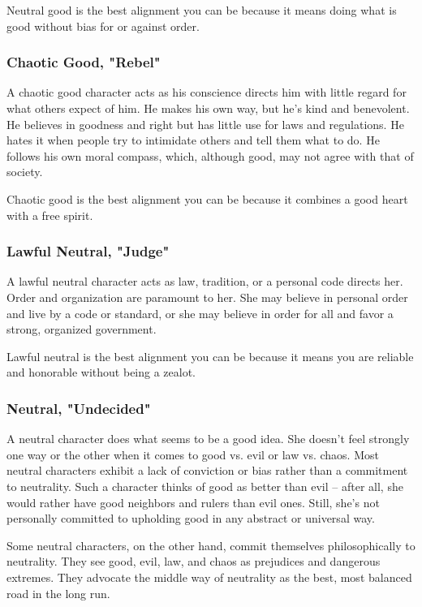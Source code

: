 Neutral good is the best alignment you can be because it means doing what is good 
without bias for or against order.

\subsubsection{Chaotic Good, "Rebel"}
A chaotic good character acts as his conscience 
directs him with little regard for what others expect of him. He makes his own 
way, but he's kind and benevolent. He believes in goodness and right but has little 
use for laws and regulations. He hates it when people try to intimidate others 
and tell them what to do. He follows his own moral compass, which, although good, 
may not agree with that of society.

Chaotic good is the best alignment you can be because it combines a good heart 
with a free spirit.

\subsubsection{Lawful Neutral, "Judge"}
A lawful neutral character acts as law, tradition, 
or a personal code directs her. Order and organization are paramount to her. She 
may believe in personal order and live by a code or standard, or she may believe 
in order for all and favor a strong, organized government.

Lawful neutral is the best alignment you can be because it means you are reliable 
and honorable without being a zealot.

\subsubsection{Neutral, "Undecided"}
A neutral character does what seems to be a good 
idea. She doesn't feel strongly one way or the other when it comes to good vs. 
evil or law vs. chaos. Most neutral characters exhibit a lack of conviction or 
bias rather than a commitment to neutrality. Such a character thinks of good as 
better than evil -- after all, she would rather have good neighbors and rulers than 
evil ones. Still, she's not personally committed to upholding good in any abstract 
or universal way.

Some neutral characters, on the other hand, commit themselves philosophically to 
neutrality. They see good, evil, law, and chaos as prejudices and dangerous extremes. 
They advocate the middle way of neutrality as the best, most balanced road in the 
long run.

